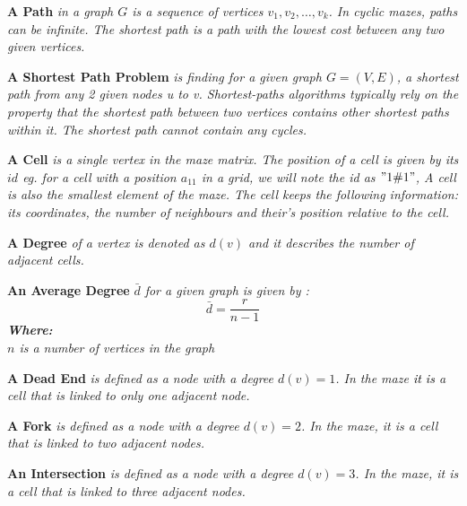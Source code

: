 \begin{definition}\textbf{A Path } \emph{in a graph $G$ is a sequence of vertices $v_1, v_2,\ldots,v_k$. In cyclic mazes, paths can be infinite. The shortest path is a path with the lowest cost between any two given vertices.\cite{9}}\end{definition}
\begin{definition}\textbf{A Shortest Path Problem } \emph{is finding for a given graph $G = (V,E)$, a shortest path from any 2 given nodes \textit{u} to \textit{v}. Shortest-paths algorithms typically rely on the property that the shortest path between two vertices contains other shortest paths within it.
The shortest path cannot contain any cycles.\cite{5}}\end{definition}
\begin{definition}\textbf{A Cell} \emph{is a single vertex in the maze matrix. The position of a cell is given by its $id$ eg. for a cell with a position $a_{11}$ in a grid, we will note the id as $"1\char"0023 1"$, A cell is also the smallest element of the maze. The cell keeps the following information: its coordinates, the number of neighbours and their’s position relative to the cell.}\end{definition}
\begin{definition}\textbf{A Degree } \emph{of a vertex is denoted as $d(v)$ and it describes the number of adjacent cells.\cite{10}}\end{definition}
\begin{definition}\textbf{An Average Degree }\emph{ $\bar{d}$ for a given graph is given by \cite{10}:\\
\begin{equation}
\bar{d} = \frac{r}{n-1}	
\end{equation}
\textbf{Where:}\\
$n$ is a number of vertices in the graph\\	
}\end{definition}
\begin{definition}\textbf{A Dead End} \emph{ is defined as a node with a degree $d(v) = 1$. In the maze \textcolor{black}{it is} a cell that is linked to only one adjacent node.}\end{definition}
\begin{definition}\textbf{A Fork} \emph{is defined as a node with a degree $d(v) = 2$. In the maze, it is a cell that is linked to two adjacent nodes.}\end{definition}
\begin{definition}\textbf{An Intersection} \emph{ is defined as a node with a degree $d(v) = 3$. In the maze, it is a cell that is linked to three adjacent nodes.}\end{definition}
